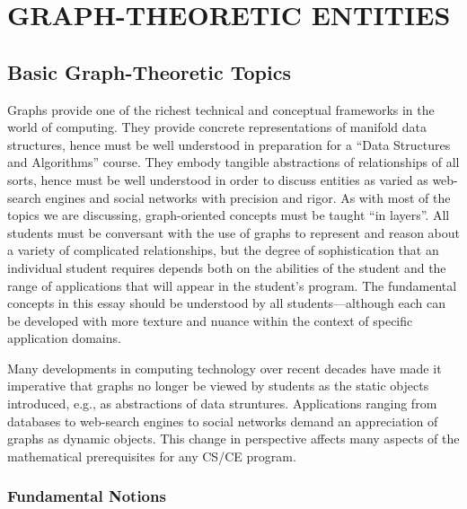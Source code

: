 
\chapter{GRAPH-THEORETIC ENTITIES}
\label{Ch:Graphs-Trees}

\section{Basic Graph-Theoretic Topics}

Graphs provide one of the richest technical and conceptual frameworks
in the world of computing.  They provide concrete representations of
manifold data structures, hence must be well understood in preparation
for a ``Data Structures and Algorithms'' course.  They embody tangible
abstractions of relationships of all sorts, hence must be well
understood in order to discuss entities as varied as web-search
engines and social networks with precision and rigor.  As with most of
the topics we are discussing, graph-oriented concepts must be taught
``in layers''.  All students must be conversant with the use of graphs
to represent and reason about a variety of complicated relationships,
but the degree of sophistication that an individual student requires
depends both on the abilities of the student and the range of
applications that will appear in the student's program.  The
fundamental concepts in this essay should be understood by all
students---although each can be developed with more texture and nuance
within the context of specific application domains.

Many developments in computing technology over recent decades have
made it imperative that graphs no longer be viewed by students as the
static objects introduced, e.g., as abstractions of data struntures.
Applications ranging from databases to web-search engines to social
networks demand an appreciation of graphs as dynamic objects.  This
change in perspective affects many aspects of the mathematical
prerequisites for any CS/CE program.

\subsection{Fundamental Notions}

